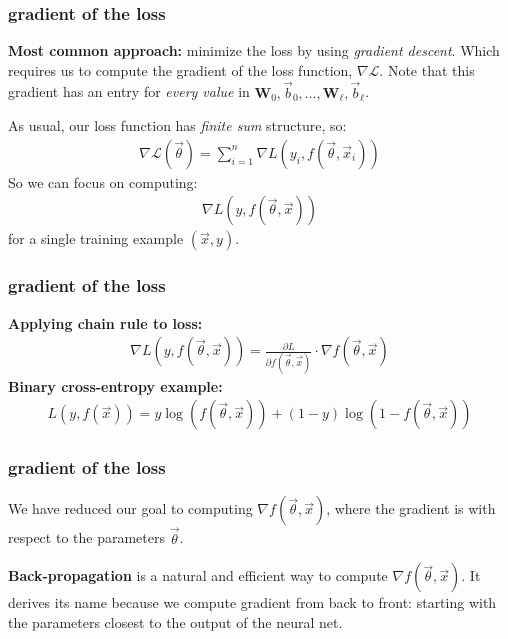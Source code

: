 \documentclass[handout,compress]{beamer}
\newcommand{\bv}[1]{\mathbf{#1}}
\begin{document}
\begin{frame}
	\frametitle{gradient of the loss}
	\textbf{Most common approach:} minimize the loss by using \emph{gradient descent}. Which requires us to compute the gradient of the loss function, $\nabla \mathcal{L}$. Note that this gradient has an entry for \emph{every value} in $\bv{W}_0,\vec{b}_0, \ldots,\bv{W}_\ell,\vec{b}_\ell$.
	
	As usual, our loss function has \emph{finite sum} structure, so:
	\begin{align*}
	\nabla \mathcal{L}(\vec{\theta}) = \sum_{i=1}^n \nabla L\left(y_i,f(\vec{\theta},\vec{x}_i)\right)
	\end{align*}
	So we can focus on computing:
	\begin{align*}
	\nabla L\left(y,f(\vec{\theta},\vec{x})\right)
	\end{align*}
	for a single training example $(\vec{x}, y)$. 
\end{frame}

\begin{frame}[t]
	\frametitle{gradient of the loss}
	\textbf{Applying chain rule to loss:}
	\begin{align*}
		\nabla L\left(y,f(\vec{\theta},\vec{x})\right) = \frac{\partial L}{\partial f(\vec{\theta},\vec{x})}\cdot \nabla f(\vec{\theta},\vec{x})
	\end{align*}
	\textbf{Binary cross-entropy example:}
	\begin{align*}
	L\left(y,f(\vec{x})\right) = y\log(f(\vec{\theta},\vec{x})) + (1-y)\log(1 - f(\vec{\theta},\vec{x}))
	\end{align*}
\end{frame}

\begin{frame}
	\frametitle{gradient of the loss}
	We have reduced our goal to computing $\nabla f(\vec{\theta}, \vec{x})$, where the gradient is with respect to the parameters $\vec{\theta}$.
	
	\textbf{Back-propagation} is a natural and efficient way to compute $\nabla f(\vec{\theta}, \vec{x})$. It derives its name because we compute gradient from back to front: starting with the parameters closest to the output of the neural net.
\end{frame}
\end{document}
